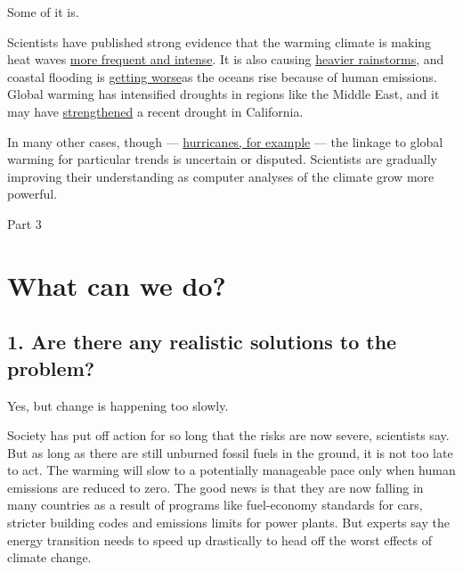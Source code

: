 Some of it is.

Scientists have published strong evidence that the warming climate is
making heat waves
\href{https://www.nytimes3xbfgragh.onion/interactive/2017/09/15/climate/does-climate-change-cause-hurricanes-drought.html}{more
frequent and intense}. It is also causing
\href{https://www.nytimes3xbfgragh.onion/2014/05/13/science/looks-like-rain-again-and-again.html?_r=0}{heavier
rainstorms}, and coastal flooding is
\href{https://www.nytimes3xbfgragh.onion/2016/09/04/science/flooding-of-coast-caused-by-global-warming-has-already-begun.html}{getting
worse}as the oceans rise because of human emissions. Global warming has
intensified droughts in regions like the Middle East, and it may have
\href{https://www.nytimes3xbfgragh.onion/2015/08/21/science/climate-change-intensifies-california-drought-scientists-say.html}{strengthened}
a recent drought in California.

In many other cases, though ---
\href{https://www.nytimes3xbfgragh.onion/2017/08/25/us/hurricane-harvey-climate-change-texas.html}{hurricanes,
for example} --- the linkage to global warming for particular trends is
uncertain or disputed. Scientists are gradually improving their
understanding as computer analyses of the climate grow more powerful.

Part 3

\hypertarget{what-can-we-do}{%
\section{What can we do?}\label{what-can-we-do}}

\hypertarget{1-are-there-any-realistic-solutions-to-the-problem}{%
\subsection{1. Are there any realistic solutions to the
problem?}\label{1-are-there-any-realistic-solutions-to-the-problem}}

Yes, but change is happening too slowly.

Society has put off action for so long that the risks are now severe,
scientists say. But as long as there are still unburned fossil fuels in
the ground, it is not too late to act. The warming will slow to a
potentially manageable pace only when human emissions are reduced to
zero. The good news is that they are now falling in many countries as a
result of programs like fuel-economy standards for cars, stricter
building codes and emissions limits for power plants. But experts say
the energy transition needs to speed up drastically to head off the
worst effects of climate change.

